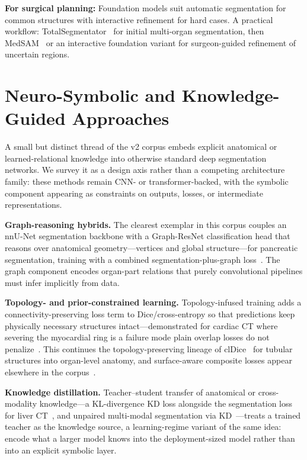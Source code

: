 \textbf{For surgical planning:} Foundation models suit automatic segmentation for common structures with interactive refinement for hard cases. A practical workflow: TotalSegmentator~\cite{wasserthal2023totalsegmentator} for initial multi-organ segmentation, then MedSAM~\cite{ma2024medsam} or an interactive foundation variant for surgeon-guided refinement of uncertain regions.

\section{Neuro-Symbolic and Knowledge-Guided Approaches}
\label{sec:neurosymbolic}

A small but distinct thread of the v2 corpus embeds explicit anatomical or learned-relational knowledge into otherwise standard deep segmentation networks. We survey it as a design axis rather than a competing architecture family: these methods remain CNN- or transformer-backed, with the symbolic component appearing as constraints on outputs, losses, or intermediate representations.

\textbf{Graph-reasoning hybrids.} The clearest exemplar in this corpus couples an nnU-Net segmentation backbone with a Graph-ResNet classification head that reasons over anatomical geometry---vertices and global structure---for pancreatic segmentation, training with a combined segmentation-plus-graph loss~\cite{tianyi2020dgraph}. The graph component encodes organ-part relations that purely convolutional pipelines must infer implicitly from data.

\textbf{Topology- and prior-constrained learning.} Topology-infused training adds a connectivity-preserving loss term to Dice/cross-entropy so that predictions keep physically necessary structures intact---demonstrated for cardiac CT where severing the myocardial ring is a failure mode plain overlap losses do not penalize~\cite{chenyu2024preservingcardiac}. This continues the topology-preserving lineage of clDice~\cite{shit2021cldice} for tubular structures into organ-level anatomy, and surface-aware composite losses appear elsewhere in the corpus~\cite{uzma2025dualscale}.

\textbf{Knowledge distillation.} Teacher--student transfer of anatomical or cross-modality knowledge---a KL-divergence KD loss alongside the segmentation loss for liver CT~\cite{pengcheng2021efficientknowledge}, and unpaired multi-modal segmentation via KD~\cite{qi2020unpairedmulti}---treats a trained teacher as the knowledge source, a learning-regime variant of the same idea: encode what a larger model knows into the deployment-sized model rather than into an explicit symbolic layer.

